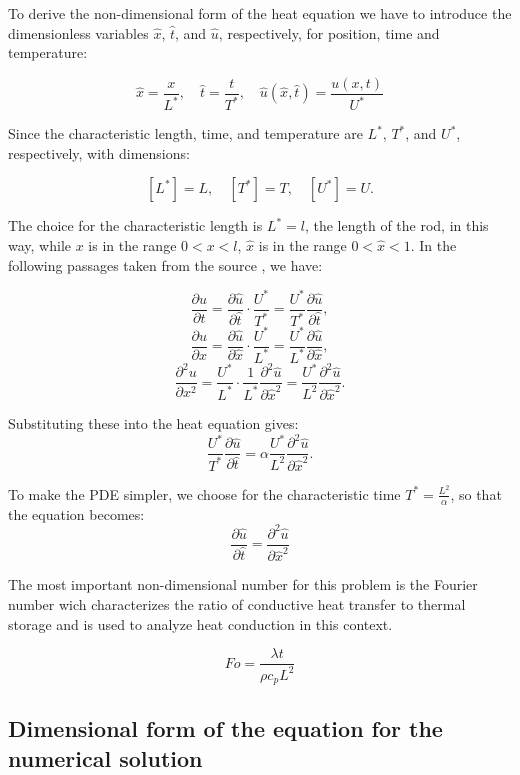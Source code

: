 \documentclass{article}
\begin{document}
To derive the non-dimensional form of the heat equation we have to introduce the dimensionless variables \(\hat{x}\), \(\hat{t}\),
and \(\hat{u}\), respectively, for position, time and temperature:

\[
\hat{x} = \frac{x}{L^*}, \quad \hat{t} = \frac{t}{T^*}, \quad \hat{u}(\hat{x}, \hat{t}) = \frac{u(x, t)}{U^*}
\]

Since the characteristic length, time, and temperature are \( L^* \), \( T^* \), and \( U^* \), respectively, with dimensions:

\[
[L^*] = L, \quad [T^*] = T, \quad [U^*] = U.
\]

The choice for the characteristic length is \( L^* = l \), the length of the rod, in this way, while \( x \) is in the range 
\( 0 < x < l \), \(\hat{x}\) is in the range \( 0 < \hat{x} < 1 \). In the following passages taken from the source \cite{HeatEquation}, we have:

\[
\frac{\partial u}{\partial t} = \frac{\partial \hat{u}}{\partial \hat{t}} \cdot \frac{U^*}{T^*} = \frac{U^*}{T^*} \frac{\partial \hat{u}}{\partial \hat{t}},
\]
\[
\frac{\partial u}{\partial x} = \frac{\partial \hat{u}}{\partial \hat{x}} \cdot \frac{U^*}{L^*} = \frac{U^*}{L^*} \frac{\partial \hat{u}}{\partial \hat{x}},
\]
\[
\frac{\partial^2 u}{\partial x^2} = \frac{U^*}{L^*} \cdot \frac{1}{L^*} \frac{\partial^2 \hat{u}}{\partial \hat{x}^2} = \frac{U^*}{L^2} \frac{\partial^2 \hat{u}}{\partial \hat{x}^2}.
\]

Substituting these into the heat equation gives:
\[
\frac{U^*}{T^*} \frac{\partial \hat{u}}{\partial \hat{t}} = \alpha \frac{U^*}{L^2} \frac{\partial^2 \hat{u}}{\partial \hat{x}^2}.
\]

To make the PDE simpler, we choose for the characteristic time \( T^* = \frac{L^2}{\alpha}\), so that the equation becomes:
\[
\frac{\partial \hat{u}}{\partial \hat{t}} = \frac{\partial^2 \hat{u}}{\partial \hat{x}^2}
\]

The most important non-dimensional number for this problem is the Fourier number wich characterizes 
the ratio of conductive heat transfer to thermal storage and is used to analyze heat conduction in this context.

\[
Fo = \frac{\lambda t}{\rho c_p L^2}
\]

\subsection{Dimensional form of the equation for the numerical solution}
\end{document}

